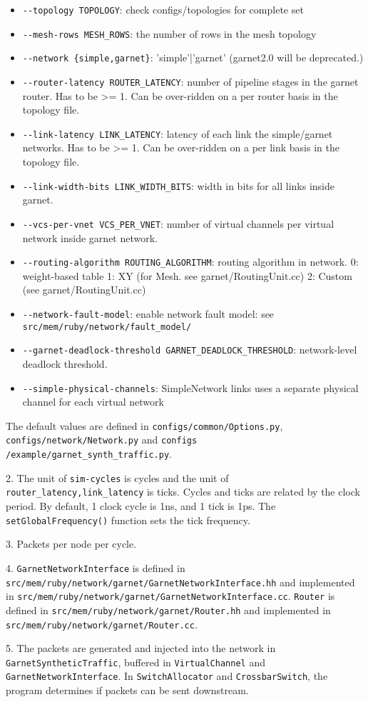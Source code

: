 \documentclass{article}
\begin{document}
\begin{itemize}
	\item \verb|--topology TOPOLOGY|: check configs/topologies for complete set
	\item \verb|--mesh-rows MESH_ROWS|: the number of rows in the mesh topology
	\item \verb|--network {simple,garnet}|: 'simple'|'garnet' (garnet2.0 will be deprecated.)
	\item \verb|--router-latency ROUTER_LATENCY|: number of pipeline stages in the garnet router. Has to be >= 1. Can be over-ridden on a per router basis in the topology file.
	\item \verb|--link-latency LINK_LATENCY|: latency of each link the simple/garnet networks. Has to be >= 1. Can be over-ridden on a per link basis in the topology file.
	\item \verb|--link-width-bits LINK_WIDTH_BITS|: width in bits for all links inside garnet.
	\item \verb|--vcs-per-vnet VCS_PER_VNET|: number of virtual channels per virtual network inside garnet network.
	\item \verb|--routing-algorithm ROUTING_ALGORITHM|: routing algorithm in network. 0: weight-based table 1: XY (for Mesh. see garnet/RoutingUnit.cc) 2: Custom (see garnet/RoutingUnit.cc)
	\item \verb|--network-fault-model|: enable network fault model: see \verb|src/mem/ruby/network/fault_model/|
	\item \verb|--garnet-deadlock-threshold GARNET_DEADLOCK_THRESHOLD|: network-level deadlock threshold.
	\item \verb|--simple-physical-channels|: SimpleNetwork links uses a separate physical channel for each virtual network
\end{itemize}
The default values are defined in \verb|configs/common/Options.py|, \verb|configs/network/Network.py| and \verb|configs| \verb|/example/garnet_synth_traffic.py|.

2. The unit of \verb|sim-cycles| is cycles and the unit of \verb|router_latency,link_latency| is ticks. Cycles and ticks are related by the clock period. By default, 1 clock cycle is 1ns, and 1 tick is 1ps. The \verb|setGlobalFrequency()| function sets the tick frequency.

3. Packets per node per cycle.

4. \verb|GarnetNetworkInterface| is defined in \verb|src/mem/ruby/network/garnet/GarnetNetworkInterface.hh| and implemented in \verb|src/mem/ruby/network/garnet/GarnetNetworkInterface.cc|. \verb|Router| is defined in \verb|src/mem/ruby/network/garnet/Router.hh| and implemented in \verb|src/mem/ruby/network/garnet/Router.cc|.

5. The packets are generated and injected into the network in \verb|GarnetSyntheticTraffic|, buffered in \verb|VirtualChannel| and \verb|GarnetNetworkInterface|. In \verb|SwitchAllocator| and \verb|CrossbarSwitch|, the program determines if packets can be sent downstream.
\end{document}
